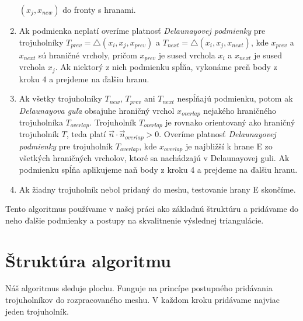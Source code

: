 \begin{enumerate}
{\begin{itemize}
{        $(x_j, x_{new})$ do fronty s hranami.}
    \end{itemize}
    }
    \item{
        Ak podmienka neplatí overíme platnosť \textit{Delaunayovej podmienky} pre trojuholníky 
        $T_{prev} = \bigtriangleup(x_i, x_j, x_{prev})$ a 
        $T_{next} = \bigtriangleup(x_i, x_j, x_{next})$, kde 
        $x_{prev}$ a $x_{next}$ sú hraničné vrcholy,
        pričom $x_{prev}$ 
        je sused vrchola $x_i$ a $x_{next}$ je sused vrchola 
        $x_j$. Ak niektorý z nich podmienku
        spĺňa, vykonáme preň body z kroku 4 a prejdeme na ďalšiu hranu.
    }
    \item{
        Ak všetky trojuholníky $T_{new}$, $T_{prev}$ ani $T_{next}$ nespĺňajú podmienku, potom 
        ak \textit{Delaunayova guľa} obsajuhe hraničný vrchol $x_{overlap}$ nejakého hraničného 
        trojuholníka $T_{overlap}$. Trojuholník $T_{overlap}$ je rovnako orientovaný ako hraničný 
        trojuholník $T$, teda platí $\vec{n} \cdot \vec{n}_{overlap} > 0$. 
        Overíme platnosť \textit{Delaunayovej podmienky} pre 
        trojuholník $T_{overlap}$, kde $x_{overlap}$ je najbližší k hrane E zo všetkých hraničných
        vrcholov, ktoré sa nachádzajú v Delaunayovej guli. Ak podmienku spĺňa aplikujeme naň body z 
        kroku 4 a prejdeme na ďalšiu hranu.
    }
    \item{
        Ak žiadny trojuholník nebol pridaný do meshu, testovanie hrany E skončíme.
    }
\end{enumerate}

Tento algoritmus používame v našej práci ako základnú štruktúru a pridávame do neho ďalšie podmienky 
a postupy na skvalitnenie výslednej triangulácie. 

\section {Štruktúra algoritmu}
\label{kap:first_part_of_algorithm}

Náš algoritmus sleduje plochu.
Funguje na princípe postupného pridávania trojuholníkov do rozpracovaného meshu. V každom kroku
pridávame najviac jeden trojuholník.

